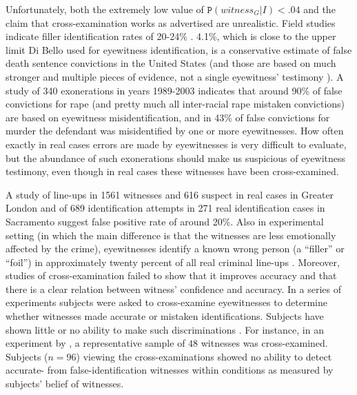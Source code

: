 \documentclass{article}
\newcommand{\pr}[1]{\mbox{$\mathtt{P}(#1)$}}
\begin{document}
Unfortunately, both the extremely low value of $\pr{witness_G\vert I}<.04$ and the claim that cross-examination works as advertised are  unrealistic. Field studies indicate filler identification rates of 20-24\% \citep{klobuchar2006improving}. 4.1\%, which is close to the upper limit Di Bello used for eyewitness identification, is a conservative estimate of false death sentence convictions in the United States (and those are based on much stronger and multiple pieces of evidence, not a single eyewitness' testimony \citep{gross2014RateFalseConviction}). A study of 340 exonerations in years 1989-2003   indicates that around 90\% of false convictions for rape (and pretty much all inter-racial rape mistaken convictions) are based on eyewitness misidentification, and in  43\%  of false convictions for murder the defendant was misidentified by one or more eyewitnesses. How often exactly in real cases errors are made by eyewitnesses is very difficult to evaluate, but the abundance of such exonerations should make us suspicious of eyewitness testimony, even though in real cases these witnesses have been cross-examined.

A study of line-ups in 1561 witnesses and 616 suspect in real cases in Greater London \citep{Wright1996ComparingSystemEstimator}  and of 689 identification attempts in 271 real identification cases in Sacramento \citep{behrman2001EyewitnessIdentificationActual} suggest false positive rate of around 20\%.
Also in experimental setting (in which the main difference is that the witnesses are less emotionally affected by the crime), eyewitnesses identify a known wrong person (a “filler” or “foil”) in approximately twenty percent of all real criminal line-ups \citep{thompson2007beyond}.  Moreover, studies of cross-examination failed to show that it improves accuracy and that there is a clear relation between witness' confidence and accuracy.   In a series of experiments    subjects were asked to cross-examine eyewitnesses to  determine whether witnesses made accurate or mistaken identifications. Subjects 
have shown little or no ability to make such discriminations    \citep{wells2003EyewitnessTestimony}.
For instance, in an experiment by \citet{Lindsay1981CanPeopleDetect},  a representative sample of $48$ witnesses 
was cross-examined. Subjects ($n = 96$) viewing the cross-examinations showed no ability to detect accurate- from false-identification witnesses within conditions as measured by subjects' belief of witnesses.
\end{document}
